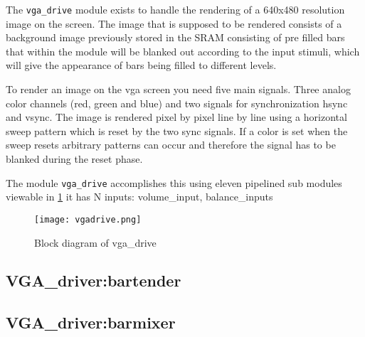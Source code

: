 The \verb+vga_drive+ module exists to handle the rendering of a 640x480 resolution image on the screen. 
The image that is supposed to be rendered consists of a background image previously 
stored in the SRAM consisting of pre filled bars that within the module will be blanked
out according to the input stimuli, which will give the appearance of bars being filled 
to different levels.   

To render an image on the vga screen you need five main signals. Three analog color channels (red, green and blue)
and two signals for synchronization hsync and vsync. The image is rendered pixel by pixel line by line using
a horizontal sweep pattern which is reset by the two sync signals. If a color is set when the sweep resets
arbitrary patterns can occur and therefore the signal has to be blanked during the reset phase.

The module \verb+vga_drive+ accomplishes this using eleven pipelined sub modules viewable in \ref{fig:vgadrive}
it has N inputs: volume\_input, balance\_inputs   

\begin{figure}[h]
        \texttt{[image: vgadrive.png]}
        \caption{Block diagram of vga\_drive}
        \label{fig:vgadrive}
\end{figure}



  \subsection{VGA\_driver:bartender}
  \subsection{VGA\_driver:barmixer}

